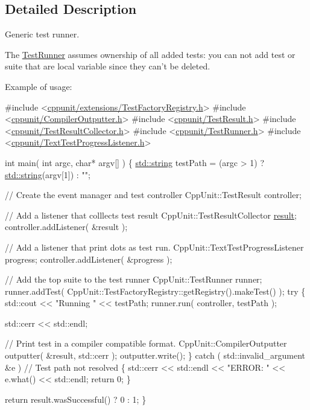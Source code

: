 \subsection{Detailed Description}
Generic test runner.

The \hyperlink{class_test_runner}{Test\-Runner} assumes ownership of all added tests\-: you can not add test or suite that are local variable since they can't be deleted. 

Example of usage\-: 
\begin{DoxyCode}
\textcolor{preprocessor}{#include <\hyperlink{_test_factory_registry_8h}{cppunit/extensions/TestFactoryRegistry.h}>}
\textcolor{preprocessor}{#include <\hyperlink{_compiler_outputter_8h}{cppunit/CompilerOutputter.h}>}
\textcolor{preprocessor}{#include <\hyperlink{_test_result_8h}{cppunit/TestResult.h}>}
\textcolor{preprocessor}{#include <\hyperlink{_test_result_collector_8h}{cppunit/TestResultCollector.h}>}
\textcolor{preprocessor}{#include <\hyperlink{_test_runner_8h}{cppunit/TestRunner.h}>}
\textcolor{preprocessor}{#include <\hyperlink{_text_test_progress_listener_8h}{cppunit/TextTestProgressListener.h}>}


\textcolor{keywordtype}{int} 
main( \textcolor{keywordtype}{int} argc, \textcolor{keywordtype}{char}* argv[] )
\{
  \hyperlink{glew_8h_ae84541b4f3d8e1ea24ec0f466a8c568b}{std::string} testPath = (argc > 1) ? \hyperlink{glew_8h_ae84541b4f3d8e1ea24ec0f466a8c568b}{std::string}(argv[1]) : \textcolor{stringliteral}{""};

  \textcolor{comment}{// Create the event manager and test controller}
  CppUnit::TestResult controller;

  \textcolor{comment}{// Add a listener that colllects test result}
  CppUnit::TestResultCollector \hyperlink{glew_8h_a5fb5836a37f7607602a16ad733ed6357}{result};
  controller.addListener( &result );        

  \textcolor{comment}{// Add a listener that print dots as test run.}
  CppUnit::TextTestProgressListener progress;
  controller.addListener( &progress );      

  \textcolor{comment}{// Add the top suite to the test runner}
  CppUnit::TestRunner runner;
  runner.addTest( CppUnit::TestFactoryRegistry::getRegistry().makeTest() );   
  \textcolor{keywordflow}{try}
  \{
    std::cout << \textcolor{stringliteral}{"Running "}  <<  testPath;
    runner.run( controller, testPath );

    std::cerr << std::endl;

    \textcolor{comment}{// Print test in a compiler compatible format.}
    CppUnit::CompilerOutputter outputter( &result, std::cerr );
    outputter.write();                      
  \}
  \textcolor{keywordflow}{catch} ( std::invalid\_argument &e )  \textcolor{comment}{// Test path not resolved}
  \{
    std::cerr  <<  std::endl  
               <<  \textcolor{stringliteral}{"ERROR: "}  <<  e.what()
               << std::endl;
    \textcolor{keywordflow}{return} 0;
  \}

  \textcolor{keywordflow}{return} result.wasSuccessful() ? 0 : 1;
\}
\end{DoxyCode}
 

